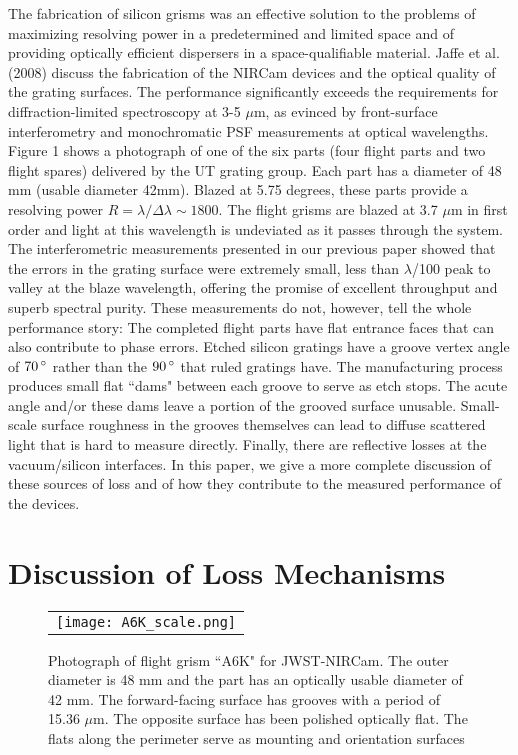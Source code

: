 The fabrication of silicon grisms was an effective solution to the problems of maximizing resolving power in a predetermined and limited space and of providing optically efficient dispersers in a space-qualifiable material.  Jaffe et al. (2008)\cite{Jaffe08} discuss the fabrication of the NIRCam devices and the optical quality of the grating surfaces.  The performance significantly exceeds the requirements for diffraction-limited spectroscopy at 3-5 $\mu$m, as evinced by front-surface interferometry and monochromatic PSF measurements at optical wavelengths.  Figure 1 shows a photograph of one of the six parts (four flight parts and two flight spares) delivered by the UT grating group.  Each part has a diameter of 48 mm (usable diameter 42mm).  Blazed at 5.75 degrees, these parts provide a resolving power $R=\lambda/\Delta \lambda \sim 1800$.  The flight grisms are blazed at 3.7 $\mu$m in first order and light at this wavelength is undeviated as it passes through the system.  The interferometric measurements presented in our previous paper showed that the errors in the grating surface were extremely small, less than $\lambda$/100 peak to valley at the blaze wavelength, offering the promise of excellent throughput and superb spectral purity.  These measurements do not, however, tell the whole performance story:  The completed flight parts have flat entrance faces that can also contribute to phase errors.  Etched silicon gratings have a groove vertex angle of $70\,^{\circ}{\rm}$ rather than the $90\,^{\circ}{\rm}$ that ruled gratings have.  The manufacturing process produces small flat ``dams" between each groove to serve as etch stops.  The acute angle and/or these dams leave a portion of the grooved surface unusable. Small-scale surface roughness in the grooves themselves can lead to diffuse scattered light that is hard to measure directly. Finally, there are reflective losses at the vacuum/silicon interfaces.   In this paper, we give a more complete discussion of these sources of loss and of how they contribute to the measured performance of the devices.

\section{Discussion of Loss Mechanisms}

   \begin{figure}
   \begin{center}
   \begin{tabular}{c}
   \texttt{[image: A6K\_scale.png]}
   \end{tabular}
   \end{center}
   \caption[JWST grism [pictures] 
   { \label{fig:im1} 
Photograph of flight grism ``A6K" for JWST-NIRCam.  The outer diameter is 48 mm and the part has an optically usable diameter of 42 mm.  The forward-facing surface has grooves with a period of 15.36 $\mu$m.  The opposite surface has been polished optically flat.  The flats along the perimeter serve as mounting and orientation surfaces}
   \end{figure} 

